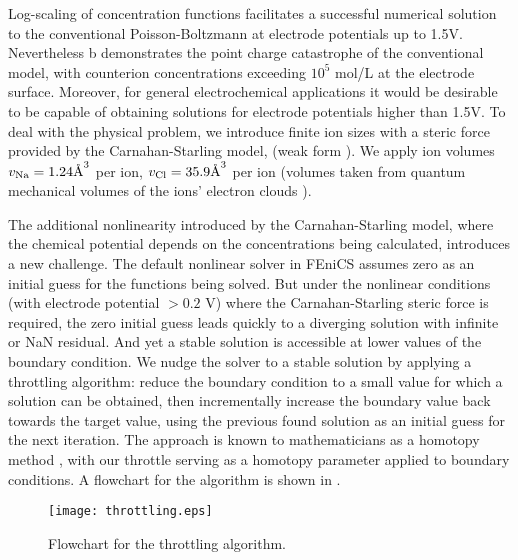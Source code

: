 Log-scaling of concentration functions facilitates a successful numerical solution to
the conventional Poisson-Boltzmann at electrode potentials
up to 1.5V. Nevertheless b demonstrates the
point charge catastrophe of the conventional model, with counterion
concentrations exceeding $10^{5}$ mol/L at the electrode
surface. Moreover, for general electrochemical applications it would
be desirable to be capable of obtaining solutions for electrode
potentials higher than 1.5V. To deal with the physical problem, we
introduce finite ion sizes with a steric force provided by the
Carnahan-Starling model,  (weak form
).  We apply ion volumes
$v_{\ce{Na}}=1.24 \text{\AA}^{3}$ per  ion,
$v_{\ce{Cl}}=35.9 \text{\AA}^{3}$ per  ion (volumes taken from
quantum mechanical volumes of the ions' electron clouds
\cite{ParsonsNinham2009}).

The additional nonlinearity introduced by the Carnahan-Starling model,
where the chemical potential depends on the concentrations being
calculated, introduces a new challenge. The default nonlinear solver
in FEniCS assumes zero as an initial guess for the functions being
solved. But under the nonlinear conditions (with electrode potential
$>0.2$ V) where the Carnahan-Starling steric force is required, the
zero initial guess leads quickly to a diverging solution with infinite
or NaN
residual. And yet a stable solution is accessible at lower values of
the boundary condition. We nudge the solver to a stable solution by
applying a throttling algorithm: reduce the boundary condition to a
small value for which a solution can be obtained, then incrementally
increase the boundary value back towards the target value, using the
previous found solution as an initial guess for the next
iteration. The approach is known to mathematicians as a homotopy
 method \cite{homotopy_analysis_Liao2012}, with our throttle
serving as a homotopy parameter applied to boundary conditions.
A flowchart for the algorithm is
shown in .

\begin{figure}
\centering
\texttt{[image: throttling.eps]}
\caption{\label{fig_throttling_algorithm}Flowchart for the throttling algorithm. }
\end{figure}

